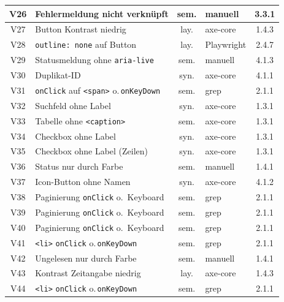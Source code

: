 \begin{longtable}{|c|p{5.8cm}|c|p{3.6cm}|c|}
V26  & Fehlermeldung nicht verknüpft             & sem. & manuell                 & 3.3.1 \\ \hline
V27  & Button Kontrast niedrig                   & lay. & axe-core                & 1.4.3 \\ \hline
V28  & \texttt{outline: none} auf Button         & lay. & Playwright              & 2.4.7 \\ \hline
V29  & Statusmeldung ohne \texttt{aria-live}     & sem. & manuell                 & 4.1.3 \\ \hline
V30  & Duplikat-ID                               & syn. & axe-core                & 4.1.1 \\ \hline
V31  & \texttt{onClick} auf \texttt{<span>} o.\,\texttt{onKeyDown} & sem. & grep & 2.1.1 \\ \hline
V32  & Suchfeld ohne Label                       & syn. & axe-core                & 1.3.1 \\ \hline
V33  & Tabelle ohne \texttt{<caption>}           & sem. & axe-core                & 1.3.1 \\ \hline
V34  & Checkbox ohne Label                       & syn. & axe-core                & 1.3.1 \\ \hline
V35  & Checkbox ohne Label (Zeilen)              & syn. & axe-core                & 1.3.1 \\ \hline
V36  & Status nur durch Farbe                    & sem. & manuell                 & 1.4.1 \\ \hline
V37  & Icon-Button ohne Namen                    & syn. & axe-core                & 4.1.2 \\ \hline
V38  & Paginierung \texttt{onClick} o.\ Keyboard & sem. & grep                   & 2.1.1 \\ \hline
V39  & Paginierung \texttt{onClick} o.\ Keyboard & sem. & grep                   & 2.1.1 \\ \hline
V40  & Paginierung \texttt{onClick} o.\ Keyboard & sem. & grep                   & 2.1.1 \\ \hline
V41  & \texttt{<li>} \texttt{onClick} o.\,\texttt{onKeyDown} & sem. & grep    & 2.1.1 \\ \hline
V42  & Ungelesen nur durch Farbe                 & sem. & manuell                 & 1.4.1 \\ \hline
V43  & Kontrast Zeitangabe niedrig               & lay. & axe-core                & 1.4.3 \\ \hline
V44  & \texttt{<li>} \texttt{onClick} o.\,\texttt{onKeyDown} & sem. & grep    & 2.1.1 \\ \hline

\end{longtable}
